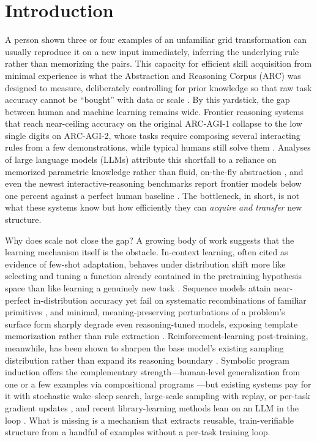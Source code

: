 \documentclass[letterpaper]{article} %
\begin{document}
\section{Introduction}

A person shown three or four examples of an unfamiliar grid transformation can
usually reproduce it on a new input immediately, inferring the underlying rule
rather than memorizing the pairs. This capacity for efficient skill acquisition
from minimal experience is what the Abstraction and Reasoning Corpus (ARC) was
designed to measure, deliberately controlling for prior knowledge so that raw
task accuracy cannot be ``bought'' with data or scale \cite{chollet2019measure}.
By this yardstick, the gap between human and machine learning remains wide.
Frontier reasoning systems that reach near-ceiling accuracy on the original
ARC-AGI-1 collapse to the low single digits on ARC-AGI-2, whose tasks require
composing several interacting rules from a few demonstrations, while typical
humans still solve them \cite{chollet2025arcagi2,arcprize2025}. Analyses of
large language models (LLMs) attribute this shortfall to a reliance on memorized
parametric knowledge rather than fluid, on-the-fly abstraction
\cite{wu2025fluid}, and even the newest interactive-reasoning benchmarks report
frontier models below one percent against a perfect human baseline
\cite{chollet2025arcagi2}. The bottleneck, in short, is not what these systems
know but how efficiently they can \emph{acquire and transfer} new structure.

Why does scale not close the gap? A growing body of work suggests that the
learning mechanism itself is the obstacle. In-context learning, often cited as
evidence of few-shot adaptation, behaves under distribution shift more like
selecting and tuning a function already contained in the pretraining hypothesis
space than like learning a genuinely new task \cite{wang2025icl}. Sequence
models attain near-perfect in-distribution accuracy yet fail on systematic
recombinations of familiar primitives \cite{lakebaroni2018scan,kim2020cogs}, and
minimal, meaning-preserving perturbations of a problem's surface form sharply
degrade even reasoning-tuned models, exposing template memorization rather than
rule extraction \cite{mirzadeh2025gsm}. Reinforcement-learning post-training,
meanwhile, has been shown to sharpen the base model's existing sampling
distribution rather than expand its reasoning boundary \cite{yue2025rl}. Symbolic
program induction offers the complementary strength---human-level generalization
from one or a few examples via compositional programs
\cite{lake2015human,ellis2021dreamcoder}---but existing systems pay for it with
stochastic wake--sleep search, large-scale sampling with replay, or per-task
gradient updates \cite{ellis2021dreamcoder,butt2024codeit,akyurek2024ttt}, and
recent library-learning methods lean on an LLM in the loop
\cite{grand2024lilo}. What is missing is a mechanism that extracts reusable,
train-verifiable structure from a handful of examples without a per-task
training loop.
\end{document}
